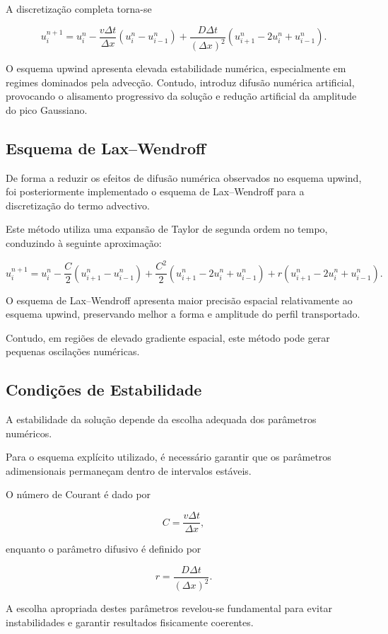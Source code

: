 \documentclass{article}
\begin{document}
A discretização completa torna-se

\[
u_i^{n+1}
=
u_i^n
-
\frac{v\Delta t}{\Delta x}
\left(
u_i^n-u_{i-1}^n
\right)
+
\frac{D\Delta t}{(\Delta x)^2}
\left(
u_{i+1}^n-2u_i^n+u_{i-1}^n
\right).
\]

O esquema upwind apresenta elevada estabilidade numérica, especialmente em regimes dominados pela advecção. Contudo, introduz difusão numérica artificial, provocando o alisamento progressivo da solução e redução artificial da amplitude do pico Gaussiano.

\subsection{Esquema de Lax--Wendroff}

De forma a reduzir os efeitos de difusão numérica observados no esquema upwind, foi posteriormente implementado o esquema de Lax--Wendroff para a discretização do termo advectivo.

Este método utiliza uma expansão de Taylor de segunda ordem no tempo, conduzindo à seguinte aproximação:

\[
u_i^{n+1}
=
u_i^n
-
\frac{C}{2}
\left(
u_{i+1}^n-u_{i-1}^n
\right)
+
\frac{C^2}{2}
\left(
u_{i+1}^n-2u_i^n+u_{i-1}^n
\right)
+
r
\left(
u_{i+1}^n-2u_i^n+u_{i-1}^n
\right).
\]

O esquema de Lax--Wendroff apresenta maior precisão espacial relativamente ao esquema upwind, preservando melhor a forma e amplitude do perfil transportado.

Contudo, em regiões de elevado gradiente espacial, este método pode gerar pequenas oscilações numéricas.

\subsection{Condições de Estabilidade}

A estabilidade da solução depende da escolha adequada dos parâmetros numéricos.

Para o esquema explícito utilizado, é necessário garantir que os parâmetros adimensionais permaneçam dentro de intervalos estáveis.

O número de Courant é dado por

\[
C
=
\frac{v\Delta t}{\Delta x},
\]

enquanto o parâmetro difusivo é definido por

\[
r
=
\frac{D\Delta t}{(\Delta x)^2}.
\]

A escolha apropriada destes parâmetros revelou-se fundamental para evitar instabilidades e garantir resultados fisicamente coerentes.
\end{document}
